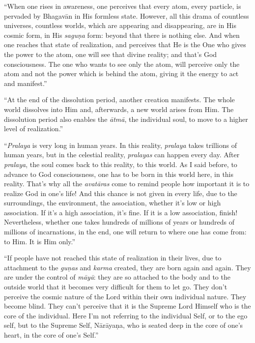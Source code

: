 \enquote{When one rises in awareness, one perceives that every atom, every particle, is pervaded by Bhagavān in His formless state. However, all this drama of countless universes, countless worlds, which are appearing and disappearing, are in His cosmic form, in His \textit{saguṇa} form: beyond that there is nothing else. And when one reaches that state of realization, and perceives that He is the One who gives the power to the atom, one will see that divine reality; and that’s God consciousness. The one who wants to see only the atom, will perceive only the atom and not the power which is behind the atom, giving it the energy to act and manifest.}

\enquote{At the end of the dissolution period, another creation manifests. The whole world dissolves into Him and, afterwards, a new world arises from Him. The dissolution period also enables the \textit{ātmā}, the individual soul, to move to a higher level of realization.}

\enquote{\textit{Pralaya} is very long in human years. In this reality, \textit{pralaya} takes trillions of human years, but in the celestial reality, \textit{pralayas} can happen every day. After \textit{pralaya}, the soul comes back to this reality, to this world. As I said before, to advance to God consciousness, one has to be born in this world here, in this reality. That’s why all the \textit{avatāras} come to remind people how important it is to realize God in one’s life! And this chance is not given in every life, due to the surroundings, the environment, the association, whether it’s low or high association. If it’s a high association, it’s fine. If it is a low association, finish! Nevertheless, whether one takes hundreds of millions of years or hundreds of millions of incarnations, in the end, one will return to where one has come from: to Him. It is Him only.}

\enquote{If people have not reached this state of realization in their lives, due to attachment to the \textit{guṇas} and \textit{karma} created, they are born again and again. They are under the control of \textit{māyā}: they are so attached to the body and to the outside world that it becomes very difficult for them to let go. They don’t perceive the cosmic nature of the Lord within their own individual nature. They become blind. They can’t perceive that it is the Supreme Lord Himself who is the core of the individual. Here I’m not referring to the individual Self, or to the ego self, but to the Supreme Self, Nārāyaṇa, who is seated deep in the core of one’s heart, in the core of one’s Self.}

